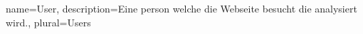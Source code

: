 {
    name=User,
    description={Eine person welche die Webseite besucht die analysiert wird.},
    plural={Users}
}

